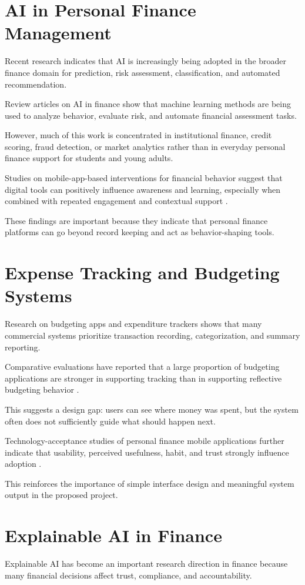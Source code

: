 \documentclass[12pt,a4paper]{report}
\begin{document}
\section{AI in Personal Finance Management}
Recent research indicates that AI is increasingly being adopted in the broader finance domain for prediction,
risk assessment,
classification,
and automated recommendation.

Review articles on AI in finance show that machine learning methods are being used to analyze behavior,
evaluate risk,
and automate financial assessment tasks.

However,
much of this work is concentrated in institutional finance,
credit scoring,
fraud detection,
or market analytics rather than in everyday personal finance support for students and young adults.

Studies on mobile-app-based interventions for financial behavior suggest that digital tools can positively influence awareness and learning,
especially when combined with repeated engagement and contextual support \cite{ref3,ref6}.

These findings are important because they indicate that personal finance platforms can go beyond record keeping and act as behavior-shaping tools.

\section{Expense Tracking and Budgeting Systems}
Research on budgeting apps and expenditure trackers shows that many commercial systems prioritize transaction recording,
categorization,
and summary reporting.

Comparative evaluations have reported that a large proportion of budgeting applications are stronger in supporting tracking than in supporting reflective budgeting behavior \cite{ref4,ref5}.

This suggests a design gap:
users can see where money was spent,
but the system often does not sufficiently guide what should happen next.

Technology-acceptance studies of personal finance mobile applications further indicate that usability,
perceived usefulness,
habit,
and trust strongly influence adoption \cite{ref4,ref9}.

This reinforces the importance of simple interface design and meaningful system output in the proposed project.

\section{Explainable AI in Finance}
Explainable AI has become an important research direction in finance because many financial decisions affect trust,
compliance,
and accountability.
\end{document}
